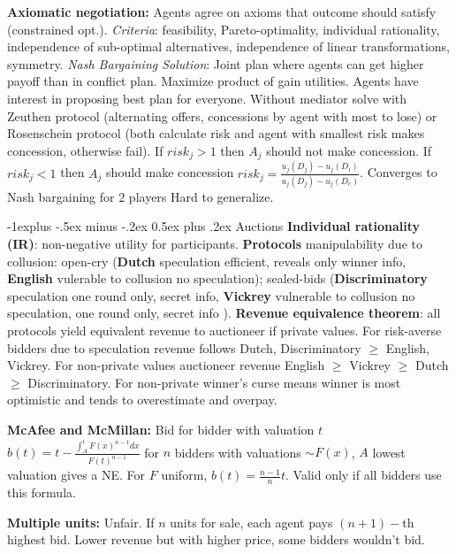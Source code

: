 \documentclass{article}
\makeatletter
\renewcommand{\subsection}{\@startsection{subsection}{2}{0mm}%
                                {-1explus -.5ex minus -.2ex}%
                                {0.5ex plus .2ex}%
                                {\color{blue}\normalfont\scriptsize\bfseries}}
\newcommand{\disadv}[1]{{\color{red} #1}}
\newcommand{\adv}[1]{{\color{green!60!blue} #1}}
\makeatother
\begin{document}
\begin{multicols*}{4}
\textbf{Axiomatic negotiation:} Agents agree on axioms that outcome should satisfy (constrained opt.). \textit{Criteria}: feasibility, Pareto-optimality, individual rationality, independence of sub-optimal alternatives, independence of linear transformations, symmetry.
\textit{Nash Bargaining Solution}: Joint plan where agents can get higher payoff than in conflict plan. Maximize product of gain utilities. Agents have interest in proposing best plan for everyone. Without mediator solve with Zeuthen protocol (alternating offers, concessions by agent with most to lose) or Rosenschein protocol (both calculate risk and agent with smallest risk makes concession, otherwise fail). If $risk_j > 1$ then $A_j$ should not make concession. If $risk_j < 1$ then $A_j$ should make concession $risk_j = \frac{u_j(D_j) - u_j(D_i)}{u_j(D_j) - u_j(D_c)}$. \adv{Converges to Nash bargaining for 2 players} \disadv{Hard to generalize}.

\subsection{Auctions}
\textbf{Individual rationality (IR)}: non-negative utility for participants. \textbf{Protocols} \disadv{manipulability due to collusion}: open-cry (\textbf{Dutch} \disadv{speculation} \adv{efficient, reveals only winner info}, \textbf{English} \disadv{vulerable to collusion} \adv{no speculation}); sealed-bids (\textbf{Discriminatory} \disadv{speculation} \adv{one round only, secret info}, \textbf{Vickrey} \disadv{vulnerable to collusion} \adv{no speculation, one round only, secret info} ).
\textbf{Revenue equivalence theorem}: all protocols yield equivalent revenue to auctioneer if private values. For risk-averse bidders due to speculation revenue follows Dutch, Discriminatory $\ge$ English, Vickrey. For non-private values auctioneer revenue English $\ge$ Vickrey $\ge$ Dutch $\ge$ Discriminatory. For non-private winner's curse means winner is most optimistic and tends to overestimate and overpay.

\textbf{McAfee and McMillan:} Bid for bidder with valuation $t$ $b(t)=t-\frac{\int_A^t F(x)^{n-1}dx}{F(t)^{n-1}}$ for $n$ bidders with valuations $\sim F(x)$, $A$ lowest valuation gives a NE. For $F$ uniform, $b(t)=\frac{n-1}{n}t$. \disadv{Valid only if all bidders use this formula}.

\textbf{Multiple units:} \disadv{Unfair}. If $n$ units for sale, each agent pays $(n+1)-$th highest bid. Lower revenue but with higher price, some bidders wouldn't bid.


\end{multicols*}
\end{document}
